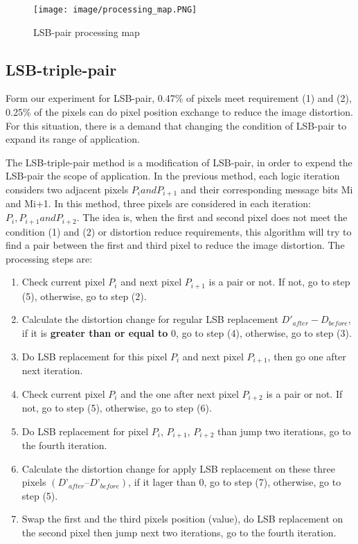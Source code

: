 \documentclass[%
    reprint,
    amsmath,amssymb,
    aps,
   ]{revtex4-1}
\begin{document}
   \begin{figure}[h]
   \texttt{[image: image/processing\_map.PNG]}
   \caption{LSB-pair processing map}
   \label{fig:figure}
   \end{figure}
   
   
   \subsection{\label{sec:level2}LSB-triple-pair}
   
   Form our experiment for LSB-pair, 0.47\% of pixels meet requirement (1) and (2), 0.25\% of the pixels can do pixel position exchange to reduce the image distortion. For this situation, there is a demand that changing the condition of LSB-pair to expand its range of application.
   
   The LSB-triple-pair method is a modification of LSB-pair, in order to expend the LSB-pair the scope of application. In the previous method, each logic iteration considers two adjacent pixels \(P_{i} and P_{i+1}\) and their corresponding message bits Mi and Mi+1. In this method, three pixels are considered in each iteration: \(P_{i}, P_{i+1} and P_{i+2}\). The idea is, when the first and second pixel does not meet the condition (1) and (2) or distortion reduce requirements, this algorithm will try to find a pair between the first and third pixel to reduce the image distortion. The processing steps are:
   
   \begin{enumerate}
   \item Check current pixel \(P_{i}\) and next pixel \(P_{i+1}\) is a pair or not. If not, go to step (5), otherwise, go to step (2).
   \item Calculate the distortion change for regular LSB replacement \(D'_{after} - D_{before}\), if it is \textbf{greater than or equal to} 0, go to step (4), otherwise, go to step (3).
   \item Do LSB replacement for this pixel \(P_{i}\) and next pixel \(P_{i+1}\), then go one after next iteration.
   \item Check current pixel \(P_{i}\) and the one after next pixel \(P_{i+2}\) is a pair or not. If not, go to step (5), otherwise, go to step (6).
   \item Do LSB replacement for pixel \(P_{i}\), \(P_{i+1}\), \(P_{i+2}\) than jump two iterations, go to the fourth iteration.
   \item Calculate the distortion change for apply LSB replacement on these three pixels \((D’_{after} – D’_{before})\), if it lager than 0, go to step (7), otherwise, go to step (5).
   \item Swap the first and the third pixels position (value), do LSB replacement on the second pixel then jump next two iterations, go to the fourth iteration.
   \end{enumerate}
   
\end{document}
